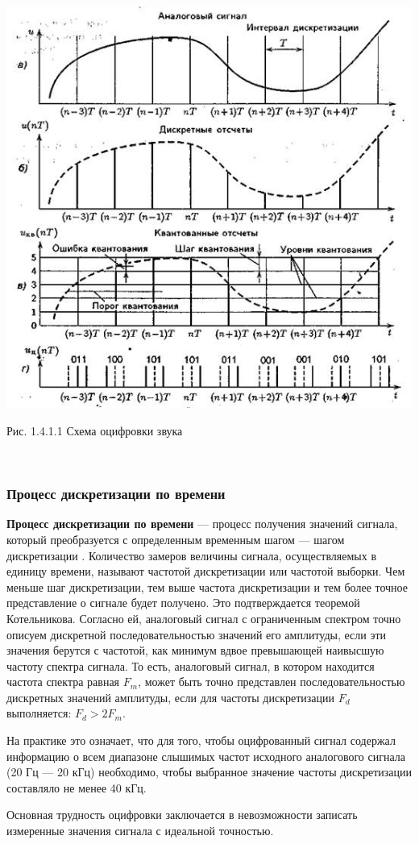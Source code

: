 \documentclass[a4paper]{report}
\begin{document}
\includegraphics[scale=0.8]{Analog_to_digi}
{\centering\par{Рис. 1.4.1.1 Схема оцифровки звука}\\}
~
\subsubsection{Процесс дискретизации по времени}
\textbf{Процесс дискретизации по времени} — процесс получения значений сигнала, который преобразуется с определенным временным шагом — шагом дискретизации . Количество замеров величины сигнала, осуществляемых в единицу времени, называют частотой дискретизации или частотой выборки. Чем меньше шаг дискретизации, тем выше частота дискретизации и тем более точное представление о сигнале будет получено.
Это подтверждается теоремой Котельникова. Согласно ей, аналоговый сигнал с ограниченным спектром точно описуем дискретной последовательностью значений его амплитуды, если эти значения берутся с частотой, как минимум вдвое превышающей наивысшую частоту спектра сигнала. То есть, аналоговый сигнал, в котором находится частота спектра равная $F_m$, может быть точно представлен последовательностью дискретных значений амплитуды, если для частоты дискретизации $F_d$ выполняется: $F_d>2F_m$.
\par На практике это означает, что для того, чтобы оцифрованный сигнал содержал информацию о всем диапазоне слышимых частот исходного аналогового сигнала (20 Гц — 20 кГц) необходимо, чтобы выбранное значение частоты дискретизации составляло не менее 40 кГц.
\par Основная трудность оцифровки заключается в невозможности записать измеренные значения сигнала с идеальной точностью.
\end{document}
